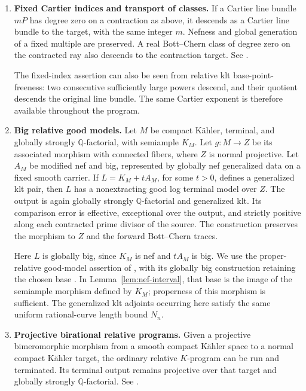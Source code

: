 \documentclass[11pt,a4paper]{article}
\theoremstyle{definition}\newtheorem{definition}[theorem]{Definition}
\theoremstyle{remark}\newtheorem*{remark}{Remark}
\newcommand{\Q}{\mathbb Q}\newcommand{\C}{\mathbb C}
\begin{document}
\begin{enumerate}[label=\textbf{(B\arabic*)},leftmargin=*]
The effective comparisons are those of \cite[Lemma~3.7]{OAI034}.
The projective construction of the steps and finiteness at positive
scaling parameters are supplied by
\cite[Proposition~3.42 and Corollary~3.50]{OAI034}.

\item\label{in:descent}
\textbf{Fixed Cartier indices and transport of classes.}
If a Cartier line bundle $mP$ has degree zero on a contraction
as above, it descends as a Cartier line bundle to the target, with the
same integer $m$. Nefness and global generation of a fixed multiple
are preserved. A real Bott--Chern class of degree zero on the contracted
ray also descends to the contraction target.
See \cite[Lemmas~3.3 and~3.15]{OAI034}.

The fixed-index assertion can also be seen from relative klt
base-point-freeness: two consecutive sufficiently large powers descend,
and their quotient descends the original line bundle. The same Cartier
exponent is therefore available throughout the program.

\item\label{in:bigrelative}
\textbf{Big relative good models.}
Let $M$ be compact Kähler, terminal, and globally strongly
$\Q$-factorial, with semiample $K_M$. Let $g:M\to Z$ be its associated
morphism with connected fibers, where $Z$ is normal projective.
Let $A_M$ be modified nef and big, represented by globally nef
generalized data on a fixed smooth carrier. If
$L=K_M+tA_M$, for some $t>0$, defines a generalized klt pair, then $L$
has a nonextracting good log terminal model over $Z$.
The output is again globally strongly $\Q$-factorial and generalized
klt. Its comparison error is effective, exceptional over the output,
and strictly positive along each contracted prime divisor of the source.
The construction preserves the morphism to $Z$ and the forward
Bott--Chern traces.

Here $L$ is globally big, since $K_M$ is nef and $tA_M$ is big.
We use the proper-relative good-model assertion of
\cite[Proposition~3.2(ii) and Theorem~3.49]{OAI034}, with its globally
big construction retaining the chosen base \cite[Lemma~3.45]{OAI034}.
In Lemma~\ref{lem:nef-interval}, that base is the image of the
semiample morphism defined by $K_M$; properness of this morphism is sufficient.
The generalized klt adjoints occurring here satisfy the same uniform
rational-curve length bound $N_n$.

\item\label{in:projrelative}
\textbf{Projective birational relative programs.}
Given a projective bimeromorphic morphism from a smooth compact Kähler
space to a normal compact Kähler target, the ordinary relative
$K$-program can be run and terminated. Its terminal output remains
projective over that target and globally strongly $\Q$-factorial.
See \cite[Proposition~3.4]{OAI034}.
\end{enumerate}
\end{document}
